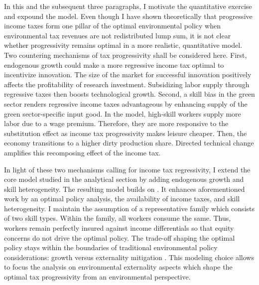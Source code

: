 In this and the subsequent three paragraphs, I motivate the quantitative exercise and expound the model.
Even though I have shown theoretically that progressive income taxes form one pillar of the optimal environmental policy when environmental tax revenues are not redistributed lump sum, it is not clear whether progressivity remains optimal in a more realistic, quantitative model. 
Two countering mechanisms of tax progressivity shall be considered here.
First, endogenous growth could make a more regressive income tax optimal to incentivize innovation. The size of the market for successful innovation positively affects the profitability of research investment. Subsidizing labor supply through regressive taxes then boosts technological growth. Second, a skill bias in the green sector renders regressive income taxes advantageous by enhancing supply of the green sector-specific input good. In the model, high-skill workers supply more labor due to a wage premium. Therefore, they are more responsive to the substitution effect as income tax progressivity makes leisure cheaper. Then, the economy transitions to a higher dirty production share. Directed technical change amplifies this recomposing effect of the income tax. 

In light of these two mechanisms calling for income tax regressivity, I extend the core model studied in the analytical section by adding endogenous growth and skill heterogeneity. The resulting model builds on \cite{Fried2018ClimateAnalysis}. It enhances aforementioned work by an optimal policy analysis, the availability of income taxes, and skill heterogeneity. 
I maintain the assumption of a representative family which consists of two skill types. Within the family, all workers consume the same. Thus, workers remain perfectly insured against income differentials so that equity concerns do not drive the optimal policy. The trade-off shaping the optimal policy stays within the boundaries of traditional environmental policy considerations: growth versus externality mitigation \citep{Stokey1998AreGrowth, Jones2016LifeGrowth, Acemoglu2012TheChange}.  This modeling choice allows to focus the analysis on environmental externality aspects which shape the optimal tax progressivity from an environmental perspective.

